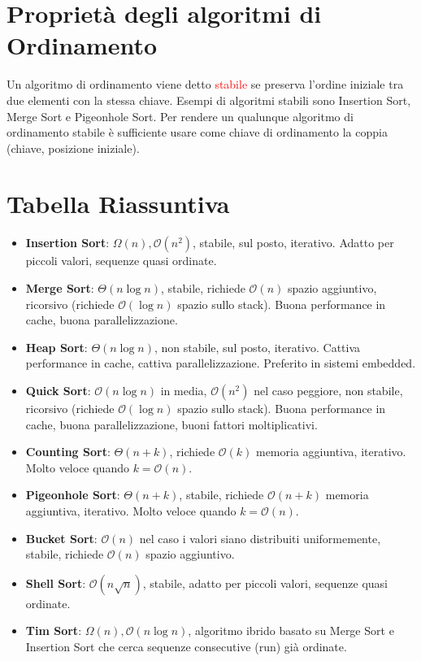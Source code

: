 \documentclass[../cheatSheetAlgoritmi.tex]{subfiles}
\begin{document}
\section{Proprietà degli algoritmi di Ordinamento}
Un algoritmo di ordinamento viene detto \textcolor{red}{stabile} se preserva l'ordine iniziale tra due elementi con la stessa chiave. Esempi di algoritmi stabili sono Insertion Sort, Merge Sort e Pigeonhole Sort. Per rendere un qualunque algoritmo di ordinamento stabile è sufficiente usare come chiave di ordinamento la coppia (chiave, posizione iniziale).

\section{Tabella Riassuntiva}
\begin{itemize}
	\item \textbf{Insertion Sort}: $\Omega(n), \mathcal{O}(n^{2})$, stabile, sul posto, iterativo. Adatto per piccoli valori, sequenze quasi ordinate.
	\item \textbf{Merge Sort}: $\Theta(n \log n)$, stabile, richiede $\mathcal{O}(n)$ spazio aggiuntivo, ricorsivo (richiede $\mathcal{O}(\log n)$ spazio sullo stack). Buona performance in cache, buona parallelizzazione.
	\item \textbf{Heap Sort}: $\Theta(n \log n)$, non stabile, sul posto, iterativo. Cattiva performance in cache, cattiva parallelizzazione. Preferito in sistemi embedded.
	\item \textbf{Quick Sort}: $\mathcal{O}(n \log n)$ in media, $\mathcal{O}(n^{2})$ nel caso peggiore, non stabile, ricorsivo (richiede $\mathcal{O}(\log n)$ spazio sullo stack). Buona performance in cache, buona parallelizzazione, buoni fattori moltiplicativi.
	\item \textbf{Counting Sort}: $\Theta(n + k)$, richiede $\mathcal{O}(k)$ memoria aggiuntiva, iterativo. Molto veloce quando $k = \mathcal{O}(n)$.
	\item \textbf{Pigeonhole Sort}: $\Theta(n + k)$, stabile, richiede $\mathcal{O}(n + k)$ memoria aggiuntiva, iterativo. Molto veloce quando $k = \mathcal{O}(n)$.
	\item \textbf{Bucket Sort}: $\mathcal{O}(n)$ nel caso i valori siano distribuiti uniformemente, stabile, richiede $\mathcal{O}(n)$ spazio aggiuntivo.
	\item \textbf{Shell Sort}: $\mathcal{O}(n \sqrt{n})$, stabile, adatto per piccoli valori, sequenze quasi ordinate.
	\item \textbf{Tim Sort}:  $\Omega(n), \mathcal{O}(n \log n)$, algoritmo ibrido basato su Merge Sort e Insertion Sort che cerca sequenze consecutive (run) già ordinate.
\end{itemize}
\end{document}
